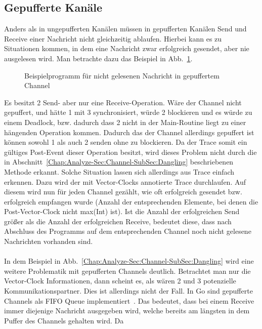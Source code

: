 \subsection{Gepufferte Kanäle}\label{Chan:Analyze-Sec:Channel-SubSec:Buffered}
Anders als in ungepufferten Kanälen müssen in gepufferten Kanälen Send und 
Receive einer Nachricht nicht gleichzeitig ablaufen. Hierbei kann es 
zu Situationen kommen, in dem eine Nachricht zwar erfolgreich gesendet, aber
nie ausgelesen wird. Man betrachte dazu das Beispiel in 
Abb.~\ref{Chap:Analyze-Sec:Channel-SubSec:Buffered-Fig:Ex1}.
\begin{figure}[h!]
  
  \caption{Beispielprogramm für nicht gelesenen Nachricht in gepuffertem Channel} 
  \label{Chap:Analyze-Sec:Channel-SubSec:Buffered-Fig:Ex1}
\end{figure}
Es besitzt 2 Send- aber nur eine Receive-Operation. Wäre der Channel nicht 
gepuffert, und hätte 1 mit 3 synchronisiert, würde 2 blockieren und es 
würde zu einem Deadlock, bzw. dadurch dass 2 nicht in der Main-Routine liegt
zu einer hängenden Operation kommen. Dadurch das der Channel allerdings gepuffert ist
können sowohl 1 als auch 2 senden ohne zu blockieren. Da der Trace somit ein gültiges Post-Event dieser Operation besitzt, 
wird dieses Problem nicht durch die in 
Abschnitt~\ref{Chap:Analyze-Sec:Channel-SubSec:Dangling} beschriebenen Methode erkannt.
Solche Situation lassen sich allerdings aus Trace einfach erkennen.
Dazu wird der mit Vector-Clocks annotierte Trace durchlaufen. Auf diesem 
wird nun für jeden Channel gezählt, wie oft erfolgreich gesendet bzw. erfolgreich empfangen 
wurde (Anzahl der entsprechenden Elemente, bei denen die Post-Vector-Clock 
nicht max(Int) ist). Ist die Anzahl der erfolgreichen Send größer als 
die Anzahl der erfolgreichen Receive, bedeutet diese, dass nach Abschluss des 
Programms auf dem entsprechenden Channel noch nicht gelesene Nachrichten vorhanden sind.\\\\
In dem Beispiel in Abb.~\ref{Chap:Analyze-Sec:Channel-SubSec:Dangling}
wird eine weitere Problematik mit gepufferten Channels deutlich. 
Betrachtet man nur die Vector-Clock Informationen, dann scheint es, als wären 
2 und 3 potenzielle Kommunikationspartner. Dies ist allerdings nicht der Fall. 
In Go sind gepufferte Channels als FIFO Queue implementiert~\cite{chan-impl}. 
Das bedeutet, dass bei einem Receive immer diejenige Nachricht ausgegeben wird, 
welche bereits am längsten in dem Puffer des Channels gehalten wird. Da 
